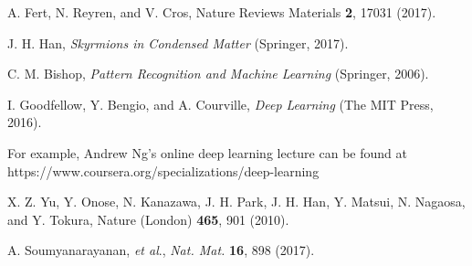 \documentclass[reprint,amsmath,amssymb,aps,showpacs,superscriptaddress,prl]{revtex4-1}
\begin{document}
\begin{thebibliography}{99}
 A. Fert, N. Reyren, and V. Cros, Nature Reviews Materials {\bf 2}, 17031 (2017).

 J. H. Han, {\it Skyrmions in Condensed Matter}  (Springer, 2017).

 C. M. Bishop, {\it Pattern Recognition and Machine Learning} (Springer, 2006).
 
 I. Goodfellow, Y. Bengio, and A. Courville, {\it Deep Learning} (The MIT Press, 2016).

 For example, Andrew Ng's online deep learning lecture can be found at https://www.coursera.org/specializations/deep-learning 

 X. Z. Yu, Y. Onose, N. Kanazawa, J. H. Park, J. H. Han, Y. Matsui, N. Nagaosa, and Y. Tokura, Nature (London) {\bf 465}, 901 (2010).

 A. Soumyanarayanan, {\it et al}., {\it Nat. Mat.} {\bf 16}, 898 (2017).


\end{thebibliography}

%
%
\end{document}
